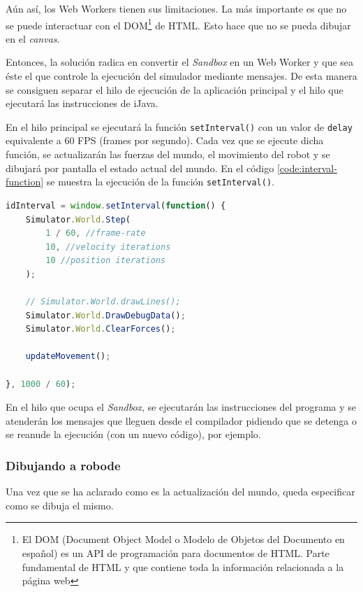 Aún así, los Web Workers tienen sus limitaciones. La más importante es que no se puede interactuar con el DOM\footnote{El DOM (Document Object Model o Modelo de Objetos del Documento en español) es un API de programación para documentos de HTML. Parte fundamental de HTML y que contiene toda la información relacionada a la página web} de HTML. Esto hace que no se pueda dibujar en el \emph{canvas}. 

Entonces, la solución radica en convertir el \emph{Sandbox} en un Web Worker y que sea éste el que controle la ejecución del simulador mediante mensajes. De esta manera se consiguen separar el hilo de ejecución de la aplicación principal y el hilo que ejecutará las instrucciones de iJava.

En el hilo principal se ejecutará la función \texttt{setInterval()} con un valor de \texttt{delay} equivalente a 60 FPS (frames por segundo). Cada vez que se ejecute dicha función, se actualizarán las fuerzas del mundo, el movimiento del robot y se dibujará por pantalla el estado actual del mundo. En el código \ref{code:interval-function} se muestra la ejecución de la función \texttt{setInterval()}.

\begin{lstlisting}[language={Javascript},label={code:interval-function}, caption={Función \texttt{setInterval()} que se ejecutara 60 veces por segundo.}]
idInterval = window.setInterval(function() {
    Simulator.World.Step(
        1 / 60, //frame-rate
        10, //velocity iterations
        10 //position iterations
    );

    // Simulator.World.drawLines();
    Simulator.World.DrawDebugData();
    Simulator.World.ClearForces();

    updateMovement();

}, 1000 / 60);
\end{lstlisting}

En el hilo que ocupa el \emph{Sandbox}, se ejecutarán las instrucciones del programa y se atenderán los mensajes que lleguen desde el compilador pidiendo que se detenga o se reanude la ejecución (con un nuevo código), por ejemplo.


\subsubsection{Dibujando a robode}

Una vez que se ha aclarado como es la actualización del mundo, queda especificar como se dibuja el mismo.

